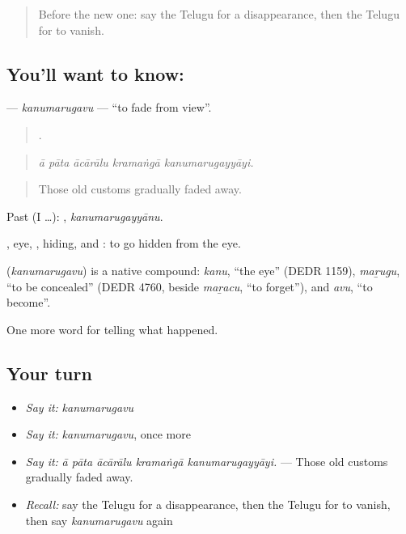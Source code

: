 \label{lesson:TE-C353-kanumarugavu}



\begin{quote}
Before the new one: say the Telugu for a disappearance, then the Telugu for to vanish.
\end{quote}

\subsection*{You'll want to know: }
\textbf{} — \emph{kanumarugavu} — \textquotedblleft{}to fade from view\textquotedblright{}.

\begin{quote}
    .
\end{quote}

\begin{quote}
\emph{ā pāta ācārālu kramaṅgā kanumarugayyāyi.}
\end{quote}

\begin{quote}
Those old customs gradually faded away.
\end{quote}

Past (I …): , \emph{kanumarugayyānu}.

, eye, , hiding, and : to go hidden from the eye.

\begin{cousinweb}
\textbf{} (\emph{kanumarugavu}) is a native compound: \emph{kanu}, \textquotedblleft{}the eye\textquotedblright{} (DEDR 1159), \emph{maṟugu}, \textquotedblleft{}to be concealed\textquotedblright{} (DEDR 4760, beside \emph{maṟacu}, \textquotedblleft{}to forget\textquotedblright{}), and \emph{avu}, \textquotedblleft{}to become\textquotedblright{}.
\end{cousinweb}

\begin{grammarlens}[title={What you've built}]
One more word for telling what happened.
\end{grammarlens}

\subsection*{Your turn}
\begin{itemize}
\raggedright
  \item \emph{Say it:} \emph{kanumarugavu}
  \item \emph{Say it:} \emph{kanumarugavu}, once more
  \item \emph{Say it:} \emph{ā pāta ācārālu kramaṅgā kanumarugayyāyi.} — Those old customs gradually faded away.
  \item \emph{Recall:} say the Telugu for a disappearance, then the Telugu for to vanish, then say \emph{kanumarugavu} again
\end{itemize}

